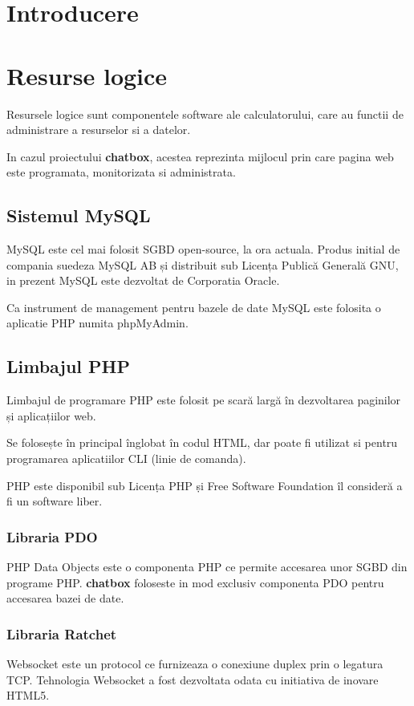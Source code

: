 \documentclass[14pt,a4paper]{extarticle}
\begin{document}


\newpage
\section{Introducere}

\newpage
\section{Resurse logice}
Resursele logice sunt componentele software ale calculatorului, care au functii de administrare a resurselor si a datelor.

In cazul proiectului \textbf{chatbox}, acestea reprezinta mijlocul prin care
pagina web este programata, monitorizata si administrata.

\subsection{Sistemul MySQL}
MySQL\cite{mysql} este cel mai folosit SGBD open-source, 
la ora actuala. Produs initial de compania suedeza MySQL AB 
și distribuit sub Licența Publică Generală GNU\cite{free}, 
in prezent MySQL este dezvoltat
de Corporatia Oracle.

Ca instrument de management pentru bazele de date MySQL
este folosita o aplicatie PHP numita phpMyAdmin.

\subsection{Limbajul PHP}
Limbajul de programare PHP\citep{php} este folosit pe scară largă 
în dezvoltarea paginilor și aplicațiilor web.

Se folosește în principal înglobat în codul HTML, dar poate fi 
utilizat si pentru programarea aplicatiilor CLI (linie de comanda).

PHP este disponibil sub Licenṭa PHP ṣi Free Software Foundation 
îl consideră a fi un software liber\citep{free}.
\subsubsection{Libraria PDO}
PHP Data Objects\citep{pdo} este o componenta PHP ce permite accesarea unor SGBD din
programe PHP. \textbf{chatbox} foloseste in mod exclusiv componenta PDO pentru 
accesarea bazei de date. 
\subsubsection{Libraria Ratchet}
Websocket\citep{websocket} este un protocol ce furnizeaza o conexiune duplex prin o legatura TCP. Tehnologia Websocket a fost dezvoltata odata cu initiativa de 
inovare HTML5. 
\end{document}
